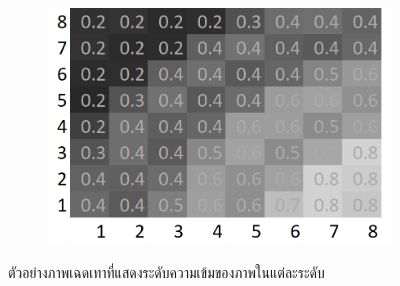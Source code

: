 \begin{figure}[H]
    \centering
    \begin{subfigure}{0.8\linewidth}
        \centering
        \includegraphics[width=0.45\linewidth]{image/grayscale-explain.png}
    \end{subfigure}
    \caption{ตัวอย่างภาพเฉดเทาที่แสดงระดับความเข้มของภาพในแต่ละระดับ}
    \label{figure:grayscale-explain}
\end{figure}